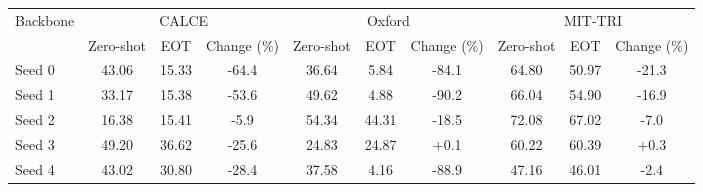 \begin{tabular}{lccccccccc}
\toprule
Backbone & \multicolumn{3}{c}{CALCE} & \multicolumn{3}{c}{Oxford} & \multicolumn{3}{c}{MIT-TRI} \\
 & Zero-shot & EOT & Change (\%) & Zero-shot & EOT & Change (\%) & Zero-shot & EOT & Change (\%) \\
\midrule
Seed 0 & 43.06 & 15.33 & -64.4 & 36.64 & 5.84 & -84.1 & 64.80 & 50.97 & -21.3 \\
Seed 1 & 33.17 & 15.38 & -53.6 & 49.62 & 4.88 & -90.2 & 66.04 & 54.90 & -16.9 \\
Seed 2 & 16.38 & 15.41 & -5.9 & 54.34 & 44.31 & -18.5 & 72.08 & 67.02 & -7.0 \\
Seed 3 & 49.20 & 36.62 & -25.6 & 24.83 & 24.87 & +0.1 & 60.22 & 60.39 & +0.3 \\
Seed 4 & 43.02 & 30.80 & -28.4 & 37.58 & 4.16 & -88.9 & 47.16 & 46.01 & -2.4 \\
\bottomrule
\end{tabular}
